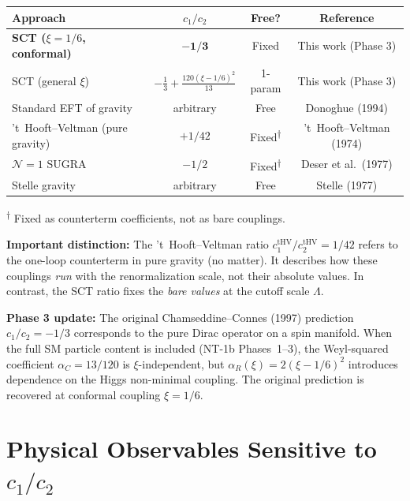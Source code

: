 \documentclass[11pt,a4paper]{article}
\begin{document}
\begin{center}
\renewcommand{\arraystretch}{1.3}
\begin{tabular}{lccc}
  \toprule
  \textbf{Approach} & $c_1/c_2$ & \textbf{Free?} & \textbf{Reference} \\
  \midrule
  \textbf{SCT ($\xi = 1/6$, conformal)} & $\mathbf{-1/3}$ & Fixed & This work (Phase 3) \\
  SCT (general $\xi$) & $-\frac{1}{3} + \frac{120(\xi-1/6)^2}{13}$ & 1-param & This work (Phase 3) \\
  Standard EFT of gravity & arbitrary & Free & Donoghue (1994) \\
  't~Hooft--Veltman (pure gravity) & $+1/42$ & Fixed\textsuperscript{$\dagger$} & 't~Hooft--Veltman (1974) \\
  $\mathcal{N}=1$ SUGRA & $-1/2$ & Fixed\textsuperscript{$\dagger$} & Deser et al.\ (1977) \\
  Stelle gravity & arbitrary & Free & Stelle (1977) \\
  \bottomrule
\end{tabular}
\end{center}
\smallskip
\noindent
\textsuperscript{$\dagger$} Fixed as counterterm coefficients, not as bare couplings.

\vspace{0.5em}
\noindent
\textbf{Important distinction:} The 't~Hooft--Veltman ratio $c_1^{\text{tHV}}/c_2^{\text{tHV}} = 1/42$ refers to the one-loop counterterm in pure gravity (no matter). It describes how these couplings \emph{run} with the renormalization scale, not their absolute values. In contrast, the SCT ratio fixes the \emph{bare values} at the cutoff scale $\Lambda$.

\vspace{0.5em}
\noindent
\textbf{Phase 3 update:} The original Chamseddine--Connes (1997) prediction $c_1/c_2 = -1/3$
corresponds to the pure Dirac operator on a spin manifold. When the full SM particle content
is included (NT-1b Phases~1--3), the Weyl-squared coefficient $\alpha_C = 13/120$ is
$\xi$-independent, but $\alpha_R(\xi) = 2(\xi - 1/6)^2$ introduces dependence on the
Higgs non-minimal coupling. The original prediction is recovered at conformal coupling $\xi = 1/6$.

\section{Physical Observables Sensitive to $c_1/c_2$}
\end{document}
